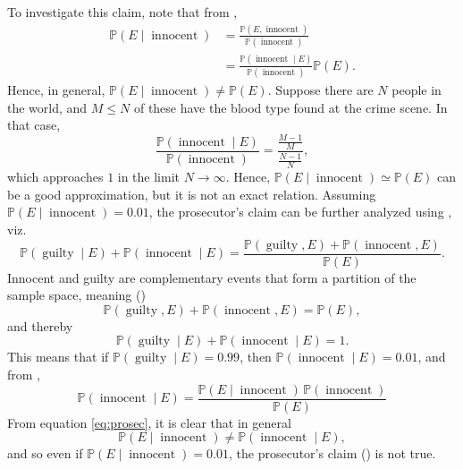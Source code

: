 \begin{example}
	To investigate this claim, note that from , 
	\begin{equation}
		\begin{split}
			\mathbb{P}(E \mid \operatorname{innocent}) &= \frac{\mathbb{P}(E, \operatorname{innocent})}{\mathbb{P}(\operatorname{innocent})} \\
			&= \frac{\mathbb{P}(\operatorname{innocent} \mid E)}{\mathbb{P}(\operatorname{innocent})} \mathbb{P}(E).
		\end{split}
	\end{equation}
	Hence, in general, $\mathbb{P}(E \mid \operatorname{innocent}) \neq \mathbb{P}(E)$. Suppose there are $N$ people in the world, and $M \leq N$ of these have the blood type found at the crime scene. In that case,
	\begin{equation}
		\frac{\mathbb{P}(\operatorname{innocent} \mid E)}{\mathbb{P}(\operatorname{innocent})} = \frac{\frac{M-1}{M}}{\frac{N-1}{N}},
	\end{equation}
	which approaches $1$ in the limit $N \rightarrow \infty$. Hence, $\mathbb{P}(E \mid \operatorname{innocent}) \simeq \mathbb{P}(E)$ can be a good approximation, but it is not an exact relation.\newline 
	Assuming $\mathbb{P}(E \mid \operatorname{innocent}) = 0.01$, the prosecutor's claim can be further analyzed using , viz.
	\begin{equation}
		\mathbb{P}(\operatorname{guilty} \mid E) + \mathbb{P}(\operatorname{innocent} \mid E) = \frac{\mathbb{P}(\operatorname{guilty}, E) + \mathbb{P}(\operatorname{innocent}, E)}{\mathbb{P}(E)}.
	\end{equation}
	Innocent and guilty are complementary events that form a partition of the sample space, meaning ()
	\begin{equation}
		\mathbb{P}(\operatorname{guilty}, E) + \mathbb{P}(\operatorname{innocent}, E) = \mathbb{P}(E),
	\end{equation}
	and thereby
	\begin{equation}
		\mathbb{P}(\operatorname{guilty} \mid E) + \mathbb{P}(\operatorname{innocent} \mid E) = 1.
	\end{equation}
	This means that if $\mathbb{P}(\operatorname{guilty} \mid E) = 0.99$, then $\mathbb{P}(\operatorname{innocent} \mid E) = 0.01$, and from ,
	\begin{equation}
			\mathbb{P}(\operatorname{innocent} \mid E) = \frac{\mathbb{P}(E \mid \operatorname{innocent}) \, \mathbb{P}(\operatorname{innocent})}{\mathbb{P}(E)}
		\label{eq:prosec}
	\end{equation}
	From equation \eqref{eq:prosec}, it is clear that in general
	\begin{equation}
		\mathbb{P}(E \mid \operatorname{innocent}) \neq \mathbb{P}(\operatorname{innocent} \mid E),
	\end{equation}
	and so even if $\mathbb{P}(E \mid \operatorname{innocent}) = 0.01$, the prosecutor's claim () is not true.
\end{example}


